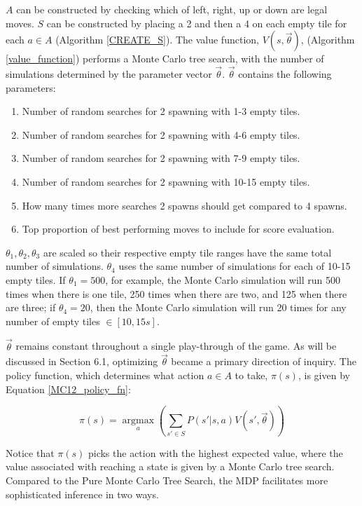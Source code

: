 \documentclass{article}
\DeclareMathOperator*{\argmax}{argmax}
\begin{document}
$A$ can be constructed by checking which of left, right, up or down are legal moves. $S$ can be constructed by placing a 2 and then a 4 on each empty tile for each $a \in A$ (Algorithm \ref{CREATE_S}). The value function, $V(s, \vec{\theta})$,  (Algorithm \ref{value_function}) performs a Monte Carlo tree search, with the number of simulations determined by the parameter vector $\vec{\theta}$.  $\vec{\theta}$ contains the following parameters:
\begin{enumerate}
	\item Number of random searches for 2 spawning with 1-3 empty tiles.
	\item Number of random searches for 2 spawning with 4-6 empty tiles.
	\item Number of random searches for 2 spawning with 7-9 empty tiles.
	\item Number of random searches for 2 spawning with 10-15 empty tiles.
	\item How many times more searches 2 spawns should get compared to 4 spawns.
	\item Top proportion of best performing moves to include for score evaluation.
\end{enumerate}

$\theta_1, \theta_2, \theta_3$ are scaled so their respective empty tile ranges have the same total number of simulations. $\theta_4$ uses the same number of simulations for each of 10-15 empty tiles.  If $\theta_1 = 500$, for example, the Monte Carlo simulation will run 500 times when there is one tile, 250 times when there are two, and 125 when there are three; if $\theta_4 = 20$, then the Monte Carlo simulation will run 20 times for any number of empty tiles $\in [10, 15s]$. 

$\vec{\theta}$ remains constant throughout a single play-through of the game.  As will be discussed in Section 6.1, optimizing $\vec{\theta}$ became a primary direction of inquiry. The policy function, which determines what action $a \in A$ to take, $\pi(s)$, is given by Equation \ref{MC12_policy_fn}:

\begin{equation}
\label{MC12_policy_fn}
\pi(s) = \argmax\limits_{a}\left( \sum\limits_{s' \in S} P(s'|s, a)V(s', \vec{\theta}) \right)
\end{equation}


Notice that $\pi(s)$ picks the action with the highest expected value, where the value associated with reaching a state is given by a Monte Carlo tree search.  Compared to the Pure Monte Carlo Tree Search, the MDP facilitates more sophisticated inference in two ways. 
\end{document}
